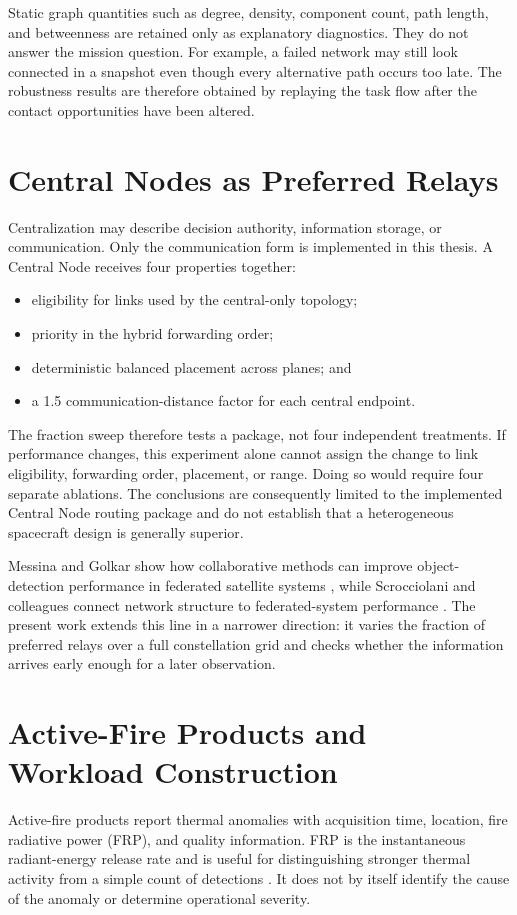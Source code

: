Static graph quantities such as degree, density, component count, path length, and betweenness are retained only as explanatory diagnostics. They do not answer the mission question. For example, a failed network may still look connected in a snapshot even though every alternative path occurs too late. The robustness results are therefore obtained by replaying the task flow after the contact opportunities have been altered.

\section{Central Nodes as Preferred Relays}
Centralization may describe decision authority, information storage, or communication. Only the communication form is implemented in this thesis. A Central Node receives four properties together:

\begin{itemize}
\item eligibility for links used by the central-only topology;
\item priority in the hybrid forwarding order;
\item deterministic balanced placement across planes; and
\item a 1.5 communication-distance factor for each central endpoint.
\end{itemize}
The fraction sweep therefore tests a package, not four independent treatments. If performance changes, this experiment alone cannot assign the change to link eligibility, forwarding order, placement, or range. Doing so would require four separate ablations. The conclusions are consequently limited to the implemented Central Node routing package and do not establish that a heterogeneous spacecraft design is generally superior.

Messina and Golkar show how collaborative methods can improve object-detection performance in federated satellite systems \citep{Messina2025}, while Scrocciolani and colleagues connect network structure to federated-system performance \citep{Scrocciolani2024}. The present work extends this line in a narrower direction: it varies the fraction of preferred relays over a full constellation grid and checks whether the information arrives early enough for a later observation.

\section{Active-Fire Products and Workload Construction}
Active-fire products report thermal anomalies with acquisition time, location, fire radiative power (FRP), and quality information. FRP is the instantaneous radiant-energy release rate and is useful for distinguishing stronger thermal activity from a simple count of detections \citep{Wooster2005}. It does not by itself identify the cause of the anomaly or determine operational severity.

